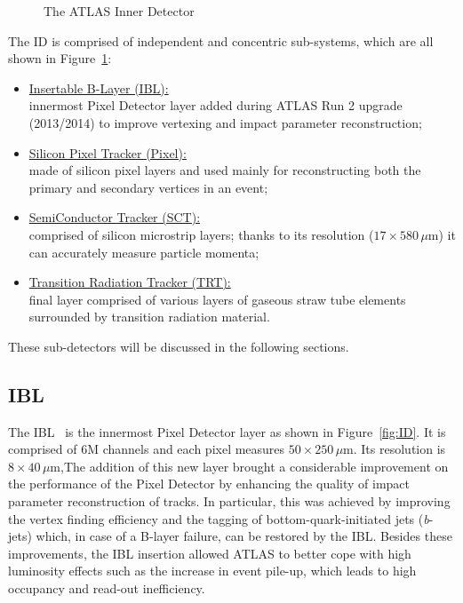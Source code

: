 			\begin{figure}[!htb]
				\hfill
				\caption{The ATLAS Inner Detector}
				\label{fig:AID}
			\end{figure}


			The ID is comprised of independent and concentric sub-systems, which are all shown in Figure~\ref{fig:AID}: %

			\begin{itemize}
				\item \underline{Insertable B-Layer (IBL):} \\innermost Pixel Detector layer added during ATLAS Run 2 upgrade (2013/2014) to improve vertexing and impact parameter reconstruction;
				\item \underline{Silicon Pixel Tracker (Pixel):} \\made of silicon pixel layers and used mainly for reconstructing both the primary and secondary vertices in an event;
				\item \underline{SemiConductor Tracker (SCT):} \\comprised of silicon microstrip layers; thanks to its resolution ($17 \times 580\, \mu$m) it can accurately measure particle momenta;
				\item \underline{Transition Radiation Tracker (TRT):} \\final layer comprised of various layers of gaseous straw tube elements surrounded by transition radiation material.
			\end{itemize}

			These sub-detectors will be discussed in the following sections.  

			\subsection*{IBL} 
				
				The IBL~\cite{IBLTDR} is the innermost Pixel Detector layer as shown in Figure~\ref{fig:ID}. It is comprised of 6M channels and each pixel measures $50 \times 250\,\mu$m. Its resolution is $8 \times 40\, \mu$m,The addition of this new layer brought a considerable improvement on the performance of the Pixel Detector by enhancing the quality of impact parameter reconstruction of tracks. In particular, this was achieved by improving the vertex finding efficiency and the tagging of bottom-quark-initiated jets (\emph{b}-jets) which, in case of a B-layer failure, can be restored by the IBL. Besides these improvements, the IBL insertion allowed ATLAS to better cope with high luminosity effects such as the increase in event pile-up, which leads to high occupancy and read-out inefficiency. 

